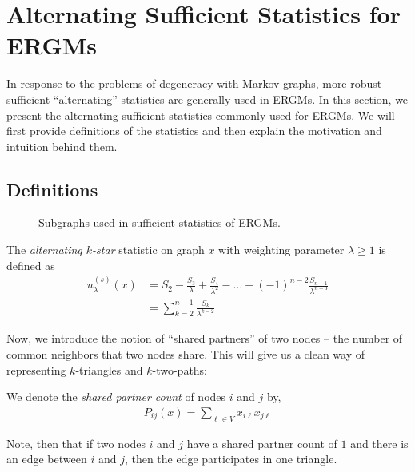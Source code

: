 \section{Alternating Sufficient Statistics for ERGMs}\label{sec:alt_stats}

In response to the problems of degeneracy with Markov graphs, more robust sufficient ``alternating'' statistics are generally used in ERGMs. In this section, we present the alternating sufficient statistics commonly used for ERGMs. We will first provide definitions of the statistics and then explain the motivation and intuition behind them.

\subsection{Definitions}

\begin{figure}[!ht]
	\label{fig:graphdiagram}
	\centering
	
	\caption{Subgraphs used in sufficient statistics of ERGMs.}
\end{figure}


\begin{definition}
	 \label{def:altkstar}
	The \emph{alternating $k$-star} statistic on graph $x$ with weighting parameter $\lambda \geq 1$ is defined as
	\begin{align*}
	u^{(s)}_\lambda(x) & = S_2 - \frac{S_3}{\lambda} + \frac{S_4}{\lambda^2} - \dots + (-1)^{n-2} \frac{S_{n-1}}{\lambda^{n-3}} \\
	&  = \sum_{k = 2}^{n-1} \frac{S_k}{\lambda^{k-2}}
	\end{align*}
\end{definition}

Now, we introduce the notion of ``shared partners'' of two nodes -- the number of common neighbors that two nodes share. This will give us a clean way of representing $k$-triangles and $k$-two-paths:
\begin{definition}
	\label{def:shared_partners}
	We denote the \emph{shared partner count} of nodes $i$ and $j$ by, 
	\begin{align}
	P_{ij}(x) = \sum_{\ell \in V} x_{i \ell} x_{j \ell}
	\end{align} 
\end{definition}
Note, then that if two nodes $i$ and $j$ have a shared partner count of $1$ and there is an edge between $i$ and $j$, then the edge participates in one triangle.

